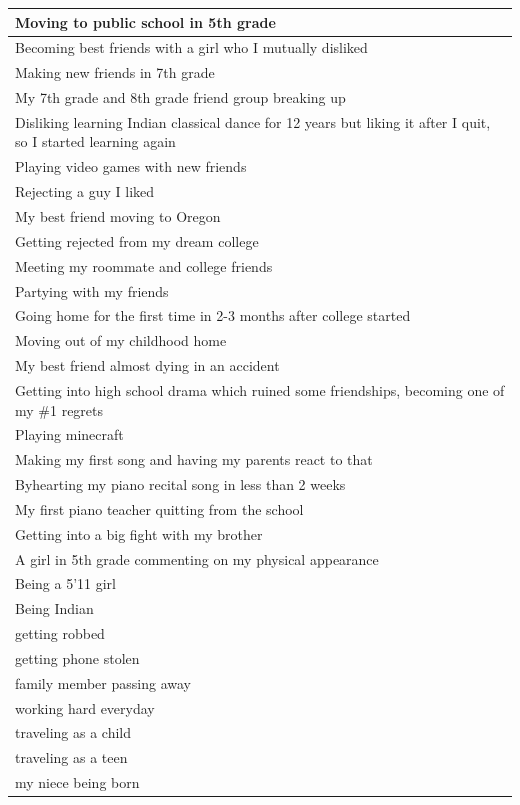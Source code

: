 \documentclass[
  .7em,
  letterpaper,
  DIV=11,
  numbers=noendperiod]{scrartcl}
\begin{document}
\begin{table}
\begin{tabular}{l}
\hline
Moving to public school in 5th grade\\
\hline
Becoming best friends with a girl who I mutually disliked\\
\hline
Making new friends in 7th grade\\
\hline
My 7th grade and 8th grade friend group breaking up\\
\hline
Disliking learning Indian classical dance for 12 years but liking it after I quit, so I started learning again\\
\hline
Playing video games with new friends\\
\hline
Rejecting a guy I liked\\
\hline
My best friend moving to Oregon\\
\hline
Getting rejected from my dream college\\
\hline
Meeting my roommate and college friends\\
\hline
Partying with my friends\\
\hline
Going home for the first time in 2-3 months after college started\\
\hline
Moving out of my childhood home\\
\hline
My best friend almost dying in an accident\\
\hline
Getting into high school drama which ruined some friendships, becoming one of my \#1 regrets\\
\hline
Playing minecraft\\
\hline
Making my first song and having my parents react to that\\
\hline
Byhearting my piano recital song in less than 2 weeks\\
\hline
My first piano teacher quitting from the school\\
\hline
Getting into a big fight with my brother\\
\hline
A girl in 5th grade commenting on my physical appearance\\
\hline
Being a 5'11 girl\\
\hline
Being Indian\\
\hline
getting robbed\\
\hline
getting phone stolen\\
\hline
family member passing away\\
\hline
working hard everyday\\
\hline
traveling as a child\\
\hline
traveling as a teen\\
\hline
my niece being born\\

\end{tabular}
\end{table}
\end{document}
